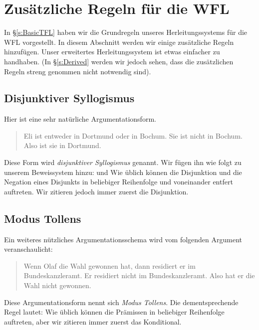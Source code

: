 \chapter{Zusätzliche Regeln für die WFL}\label{s:Further}
In \S\ref{s:BasicTFL} haben wir die Grundregeln unseres Herleitungssystems für die WFL vorgestellt. In diesem Abschnitt werden wir einige zusätzliche Regeln hinzufügen. Unser erweitertes Herleitungssystem ist etwas einfacher zu handhaben. (In \S\ref{s:Derived} werden wir jedoch sehen, dass die zusätzlichen Regeln streng genommen nicht notwendig sind).

\section{Disjunktiver Syllogismus}
Hier ist eine sehr natürliche Argumentationsform.
	\begin{quote}
		Eli ist entweder in Dortmund oder in Bochum. Sie ist nicht in Bochum. Also ist sie in Dortmund.
	\end{quote}
Diese Form wird \emph{disjunktiver Syllogismus} genannt. Wir fügen ihn wie folgt zu unserem Beweissystem hinzu:
und
Wie üblich können die Disjunktion und die Negation eines Disjunkts in beliebiger Reihenfolge und voneinander entfert auftreten. Wir zitieren jedoch immer zuerst die Disjunktion. 

\section{Modus Tollens}
Ein weiteres nützliches Argumentationsschema wird vom folgenden Argument veranschaulicht:
	\begin{quote}
		Wenn Olaf die Wahl gewonnen hat, dann residiert er im Bundeskanzleramt. Er residiert nicht im Bundeskanzleramt. Also hat er die Wahl nicht gewonnen.
	\end{quote}
Diese Argumentationsform nennt sich \emph{Modus Tollens}. Die dementsprechende Regel lautet:
Wie üblich können die Prämissen in beliebiger Reihenfolge auftreten, aber wir zitieren immer zuerst das Konditional.

